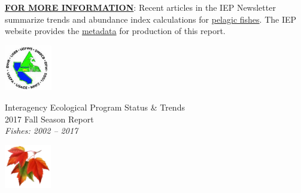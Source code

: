 \documentclass[]{article}\usepackage[]{graphicx}\usepackage[]{color}
\begin{document}
\begin{Row}
    \begin{Cell}{14}
      \textbf{\underline{FOR MORE INFORMATION}}: Recent articles in the IEP Newsletter 
			summarize trends and abundance index calculations for 
			\href{https://water.ca.gov/-/media/DWR-Website/Web-Pages/Programs/Environmental-Services/Interagency-Ecological-Program/Files/Newsletters/IEP-Newsletter-Vol30-Issue2---2017.pdf}{pelagic fishes}. 
			The IEP website provides the 
			\href{https://water.ca.gov/-/media/DWR-Website/Web-Pages/Programs/Environmental-Services/Interagency-Ecological-Program/Files/Interagency-Ecological-Program-Status-and-Trends-Fall-2017.pdf}{metadata} 
			for production of this report.
    \end{Cell}
    \begin{Cell}{2}

    \end{Cell}
\end{Row}



\newpage



\begin{Row}
  \begin{Cell}{1}
    \begin{center}
      \includegraphics[align=m,height=2cm]{figures/IEP_logo.PNG}
    \end{center}
  \end{Cell}
  \begin{Cell}{6}
    \begin{center}
      \vspace{-0.8cm}		%
      \doublespacing
      {\Large Interagency Ecological Program Status \& Trends } \\
      \vspace{0.2cm}
      {\Huge 2017 Fall Season Report} \\
      {\Large \emph{Fishes: 2002 -- 2017}}
    \end{center}
  \end{Cell}
  \begin{Cell}{1}
    \begin{center}
      \includegraphics[align=m,height=1.9cm]{figures/fall_logo.PNG}
    \end{center}
  \end{Cell}
  \begin{Cell}{4}
  \end{Cell}
\end{Row}
\end{document}
